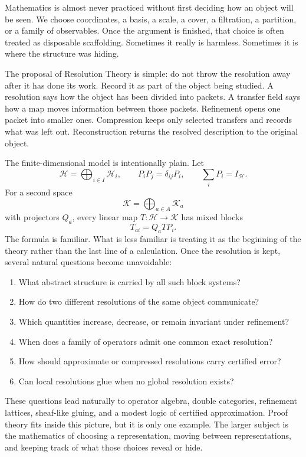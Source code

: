 \documentclass[11pt]{article}
\theoremstyle{definition}
\theoremstyle{remark}
\begin{document}
Mathematics is almost never practiced without first deciding how an object will be seen.  We choose coordinates, a basis, a scale, a cover, a filtration, a partition, or a family of observables.  Once the argument is finished, that choice is often treated as disposable scaffolding.  Sometimes it really is harmless.  Sometimes it is where the structure was hiding.

The proposal of Resolution Theory is simple: do not throw the resolution away after it has done its work.  Record it as part of the object being studied.  A resolution says how the object has been divided into packets.  A transfer field says how a map moves information between those packets.  Refinement opens one packet into smaller ones.  Compression keeps only selected transfers and records what was left out.  Reconstruction returns the resolved description to the original object.

The finite-dimensional model is intentionally plain.  Let
\[
\mathcal H=\bigoplus_{i\in I}\mathcal H_i,
\qquad
P_iP_j=\delta_{ij}P_i,
\qquad
\sum_iP_i=I_\mathcal H.
\]
For a second space
\[
\mathcal K=\bigoplus_{a\in A}\mathcal K_a
\]
with projectors \(Q_a\), every linear map \(T:\mathcal H\to\mathcal K\) has mixed blocks
\[
T_{ai}=Q_aTP_i.
\]
The formula is familiar.  What is less familiar is treating it as the beginning of the theory rather than the last line of a calculation.  Once the resolution is kept, several natural questions become unavoidable:
\begin{enumerate}[label=\arabic*.]
\item What abstract structure is carried by all such block systems?
\item How do two different resolutions of the same object communicate?
\item Which quantities increase, decrease, or remain invariant under refinement?
\item When does a family of operators admit one common exact resolution?
\item How should approximate or compressed resolutions carry certified error?
\item Can local resolutions glue when no global resolution exists?
\end{enumerate}

These questions lead naturally to operator algebra, double categories, refinement lattices, sheaf-like gluing, and a modest logic of certified approximation.  Proof theory fits inside this picture, but it is only one example.  The larger subject is the mathematics of choosing a representation, moving between representations, and keeping track of what those choices reveal or hide.
\end{document}
